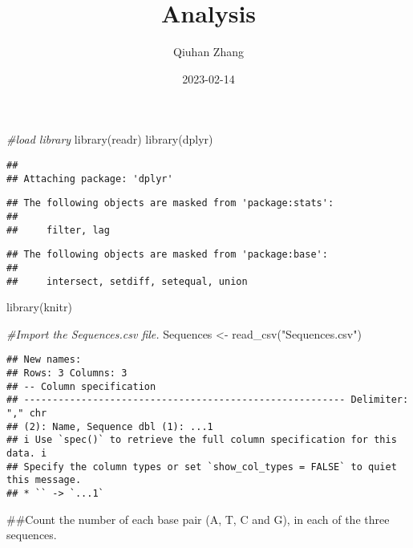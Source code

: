 \documentclass[
]{article}
\title{Analysis}
\author{Qiuhan Zhang}
\date{2023-02-14}
\newenvironment{Shaded}{\begin{snugshade}}{\end{snugshade}}
\newcommand{\CommentTok}[1]{\textcolor[rgb]{0.56,0.35,0.01}{\textit{#1}}}
\newcommand{\FunctionTok}[1]{\textcolor[rgb]{0.00,0.00,0.00}{#1}}
\newcommand{\NormalTok}[1]{#1}
\newcommand{\OtherTok}[1]{\textcolor[rgb]{0.56,0.35,0.01}{#1}}
\newcommand{\StringTok}[1]{\textcolor[rgb]{0.31,0.60,0.02}{#1}}
\begin{document}
\maketitle

\begin{Shaded}
\begin{Highlighting}[]
\CommentTok{\#load library}
\FunctionTok{library}\NormalTok{(readr)}
\FunctionTok{library}\NormalTok{(dplyr)}
\end{Highlighting}
\end{Shaded}

\begin{verbatim}
## 
## Attaching package: 'dplyr'
\end{verbatim}

\begin{verbatim}
## The following objects are masked from 'package:stats':
## 
##     filter, lag
\end{verbatim}

\begin{verbatim}
## The following objects are masked from 'package:base':
## 
##     intersect, setdiff, setequal, union
\end{verbatim}

\begin{Shaded}
\begin{Highlighting}[]
\FunctionTok{library}\NormalTok{(knitr)}
\end{Highlighting}
\end{Shaded}

\begin{Shaded}
\begin{Highlighting}[]
\CommentTok{\#Import the Sequences.csv file.}
\NormalTok{Sequences }\OtherTok{\textless{}{-}} \FunctionTok{read\_csv}\NormalTok{(}\StringTok{"Sequences.csv"}\NormalTok{)}
\end{Highlighting}
\end{Shaded}

\begin{verbatim}
## New names:
## Rows: 3 Columns: 3
## -- Column specification
## -------------------------------------------------------- Delimiter: "," chr
## (2): Name, Sequence dbl (1): ...1
## i Use `spec()` to retrieve the full column specification for this data. i
## Specify the column types or set `show_col_types = FALSE` to quiet this message.
## * `` -> `...1`
\end{verbatim}

\#\#Count the number of each base pair (A, T, C and G), in each of the
three sequences.
\end{document}
